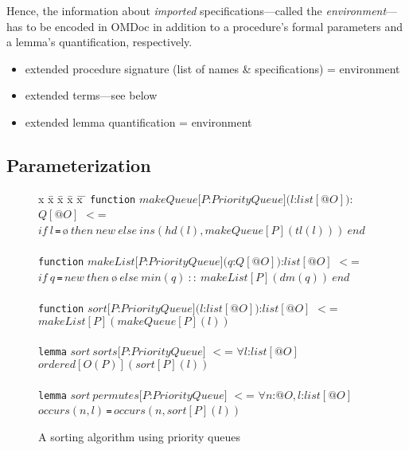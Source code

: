 \documentclass{article}
\theoremstyle{remark}
\theoremstyle{definition}
\newcommand{\iif}{\mathit{if}\ }
\newcommand{\ithen}{\mathit{then}\ }
\newcommand{\ielse}{\mathit{else}\ }
\newcommand{\iend}{\mathit{end}\ }
\newcommand{\ieq}{\,\texttt{=}\,}
\newcommand{\name}[1]{\mathit{#1}}
\begin{document}
Hence, the information about \emph{imported} specifications---called the \emph{environment}---has to be encoded in
OMDoc in addition to a procedure's formal parameters and a lemma's quantification, respectively.

\begin{itemize}

 \item extended procedure signature (list of names \& specifications) = environment

 \item extended terms---see below

 \item extended lemma quantification = environment

\end{itemize}

\subsection{Parameterization}

\begin{figure}[t]
\begin{tabbing}
x \= x \= x \= x \= x \= \kill
\texttt{function} $\name{makeQueue}[P$:$\name{PriorityQueue}](l$:$\name{list}[@O])$:$Q[@O]$ $<$=\\
$\iif l$\ieq$\mbox{\o}\ \ithen \name{new}\ \ielse \name{ins}(\name{hd}(l),\name{makeQueue}[P](\name{tl}(l)))\ \iend$\\
\\
\texttt{function} $\name{makeList}[P$:$\name{PriorityQueue}](q$:$Q[@O])$:$\name{list}[@O]$ $<$= \\
$\iif q$\ieq$\name{new}\ \ithen \mbox{\o}\ \ielse \name{min}(q)\ \name{::}\ \name{makeList}[P](\name{dm}(q))\ \iend$ \\
\\
\texttt{function} $\name{sort} [P$:$\name{PriorityQueue}](l$:$\name{list}[@O])$:$\name{list}[@O]$ $<$= \\
$\name{makeList}[P](\name{makeQueue}[P](l))$ \\
\\
\texttt{lemma} $\name{sort}\ \name{sorts}[P$:$\name{PriorityQueue}]$ $<$= $\forall l$:$\name{list}[@O]$
$\name{ordered}[O(P)](\name{sort}[P](l))$ \\
\\
\texttt{lemma} $\name{sort}\ \name{permutes}[P$:$\name{PriorityQueue}]$ $<$= $\forall n$:$@O, l$:$\name{list}[@O]$\\
\> $\name{occurs}(n,l)$\ieq$\name{occurs}(n,\name{sort}[P](l))$
\end{tabbing}
\caption{A sorting algorithm using priority queues} \label{fig:pqsorting}
\end{figure}
\end{document}
